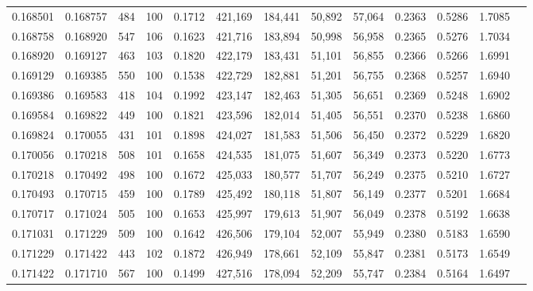 \begin{tabular}{rrrrrrrrrrrrr}
0.168501 & 0.168757 &   484 & 100 &                                     0.1712 & 421,169 & 184,441 &  50,892 &  57,064 & 0.2363 & 0.5286 & 1.7085 \\
0.168758 & 0.168920 &   547 & 106 &                                     0.1623 & 421,716 & 183,894 &  50,998 &  56,958 & 0.2365 & 0.5276 & 1.7034 \\
0.168920 & 0.169127 &   463 & 103 &                                     0.1820 & 422,179 & 183,431 &  51,101 &  56,855 & 0.2366 & 0.5266 & 1.6991 \\
0.169129 & 0.169385 &   550 & 100 &                                     0.1538 & 422,729 & 182,881 &  51,201 &  56,755 & 0.2368 & 0.5257 & 1.6940 \\
0.169386 & 0.169583 &   418 & 104 &                                     0.1992 & 423,147 & 182,463 &  51,305 &  56,651 & 0.2369 & 0.5248 & 1.6902 \\
0.169584 & 0.169822 &   449 & 100 &                                     0.1821 & 423,596 & 182,014 &  51,405 &  56,551 & 0.2370 & 0.5238 & 1.6860 \\
0.169824 & 0.170055 &   431 & 101 &                                     0.1898 & 424,027 & 181,583 &  51,506 &  56,450 & 0.2372 & 0.5229 & 1.6820 \\
0.170056 & 0.170218 &   508 & 101 &                                     0.1658 & 424,535 & 181,075 &  51,607 &  56,349 & 0.2373 & 0.5220 & 1.6773 \\
0.170218 & 0.170492 &   498 & 100 &                                     0.1672 & 425,033 & 180,577 &  51,707 &  56,249 & 0.2375 & 0.5210 & 1.6727 \\
0.170493 & 0.170715 &   459 & 100 &                                     0.1789 & 425,492 & 180,118 &  51,807 &  56,149 & 0.2377 & 0.5201 & 1.6684 \\
0.170717 & 0.171024 &   505 & 100 &                                     0.1653 & 425,997 & 179,613 &  51,907 &  56,049 & 0.2378 & 0.5192 & 1.6638 \\
0.171031 & 0.171229 &   509 & 100 &                                     0.1642 & 426,506 & 179,104 &  52,007 &  55,949 & 0.2380 & 0.5183 & 1.6590 \\
0.171229 & 0.171422 &   443 & 102 &                                     0.1872 & 426,949 & 178,661 &  52,109 &  55,847 & 0.2381 & 0.5173 & 1.6549 \\
0.171422 & 0.171710 &   567 & 100 &                                     0.1499 & 427,516 & 178,094 &  52,209 &  55,747 & 0.2384 & 0.5164 & 1.6497 \\

\end{tabular}
